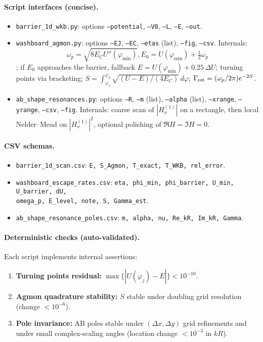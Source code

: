 \documentclass[11pt]{article}
\theoremstyle{definition}
\begin{document}
    \paragraph{Script interfaces (concise).}
    \begin{itemize}
    	\item \texttt{barrier\_1d\_wkb.py}: options \texttt{--potential}, \texttt{--V0}, \texttt{--L}, \texttt{--E}, \texttt{--out}.
    	\item \texttt{washboard\_agmon.py}: options \texttt{--EJ}, \texttt{--EC}, \texttt{--etas} (list), \texttt{--fig}, \texttt{--csv}.
    	Internals: $$\omega_p=\sqrt{8E_C U''(\varphi_{\min})}, E_0=U(\varphi_{\min})+\tfrac12\omega_p$$; if $E_0$ approaches the barrier, fallback $E=U(\varphi_{\min})+0.25\,\Delta U$; turning points via bracketing; $S=\int_{\varphi_1}^{\varphi_2}\sqrt{(U-E)/(4E_C)}\,d\varphi$; $\Gamma_{\rm est}=(\omega_p/2\pi)e^{-2S}$.
    	\item \texttt{ab\_shape\_resonances.py}: options \texttt{--R}, \texttt{--m} (list), \texttt{--alpha} (list), \texttt{--xrange}, \texttt{--yrange}, \texttt{--csv}, \texttt{--fig}.
    	Internals: coarse scan of $|H^{(1)}_{\nu}|$ on a rectangle, then local Nelder--Mead on $|H^{(1)}_{\nu}|^2$, optional polishing of $\Re H=\Im H=0$.
    \end{itemize}
    
    \paragraph{CSV schemas.}
    \begin{itemize}
    	\item \texttt{barrier\_1d\_scan.csv}: \texttt{E, S\_Agmon, T\_exact, T\_WKB, rel\_error}.
    	\item \texttt{washboard\_escape\_rates.csv}: \texttt{eta, phi\_min, phi\_barrier, U\_min, U\_barrier, dU, \\ omega\_p, E\_level, note, S, Gamma\_est}.
    	\item \texttt{ab\_shape\_resonance\_poles.csv}: \texttt{m, alpha, nu, Re\_kR, Im\_kR, Gamma}.
    \end{itemize}
    
    \paragraph{Deterministic checks (auto-validated).}
    Each script implements internal assertions:
    \begin{enumerate}
    	\item \textbf{Turning points residual:} $\max\{|U(\varphi_j)-E|\}<10^{-10}$.
    	\item \textbf{Agmon quadrature stability:} $S$ stable under doubling grid resolution (change $<10^{-6}$).
    	\item \textbf{Pole invariance:} AB poles stable under $(\Delta x,\Delta y)$ grid refinements and under small complex-scaling angles (location change $<10^{-3}$ in $kR$).
    \end{enumerate}
    
\end{document}
